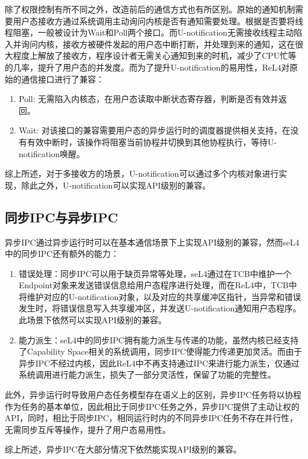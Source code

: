 除了权限控制有所不同之外，改造前后的通信方式也有所区别。原始的通知机制需要用户态接收方通过系统调用主动询问内核是否有通知需要处理。根据是否要将线程阻塞，一般被设计为Wait和Poll两个接口。而U-notification无需接收线程主动陷入并询问内核，接收方被硬件发起的用户态中断打断，并处理到来的通知，这在很大程度上解放了接收方，程序设计者无需关心通知到来的时机，减少了CPU忙等的几率，提升了用户态的并发度。而为了提升U-notification的易用性，ReL4对原始的通信接口进行了兼容：
\begin{enumerate}
  \item Poll: 无需陷入内核态，在用户态读取中断状态寄存器，判断是否有效并返回。
  \item Wait: 对该接口的兼容需要用户态的异步运行时的调度器提供相关支持，在没有有效中断时，该操作将阻塞当前协程并切换到其他协程执行，等待U-notification唤醒。
\end{enumerate}

综上所述，对于多接收方的场景，U-notification可以通过多个内核对象进行实现，除此之外，U-notification可以实现API级别的兼容。

\subsection{同步IPC与异步IPC}

异步IPC通过异步运行时可以在基本通信场景下上实现API级别的兼容，然而seL4中的同步IPC还有额外的能力：
\begin{enumerate}
  \item 错误处理：同步IPC可以用于缺页异常等处理，seL4通过在TCB中维护一个Endpoint对象来发送错误信息给用户态程序进行处理，而在ReL4中，TCB中将维护对应的U-notification对象，以及对应的共享缓冲区指针，当异常和错误发生时，将错误信息写入共享缓冲区，并发送U-notification通知用户态程序。此场景下依然可以实现API级别的兼容。
  \item 能力派生：seL4中的同步IPC拥有能力派生与传递的功能，虽然内核已经支持了Capability Space相关的系统调用，同步IPC使得能力传递更加灵活。而由于异步IPC不经过内核，因此ReL4中不再支持通过IPC来进行能力派生，仅通过系统调用进行能力派生，损失了一部分灵活性，保留了功能的完整性。
\end{enumerate}

此外，异步运行时导致用户态任务模型存在语义上的区别，异步IPC任务将以协程作为任务的基本单位，因此相比于同步IPC任务之外，异步IPC提供了主动让权的API，同时，相比于同步IPC，相同运行时内的不同异步IPC任务不存在并行性，无需同步互斥等操作，提升了用户态易用性。

综上所述，异步IPC在大部分情况下依然能实现API级别的兼容。

